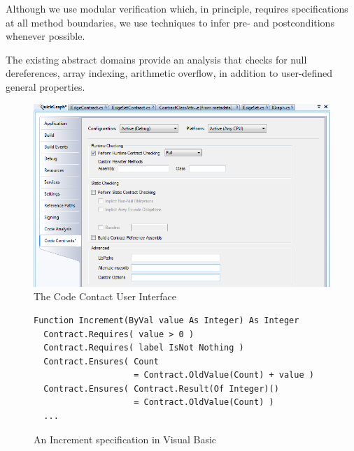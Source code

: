 \documentclass[10pt,twocolumn]{article}
\begin{document}
Although we use modular verification which, in principle, requires
specifications at all method boundaries, we use techniques to infer
pre- and postconditions whenever possible.

The existing abstract domains provide an analysis that checks for
null dereferences, array indexing, arithmetic overflow, in addition
to user-defined general properties.


\begin{figure}[tb]
\begin{center}
  \includegraphics[width=2\columnwidth]{ContractUI.png}
\end{center}
\caption{The Code Contact User Interface}
\label{fig:contractui}
\end{figure}

\begin{figure}[thb]
\begin{small}
\begin{lstlisting}
Function Increment(ByVal value As Integer) As Integer
  Contract.Requires( value > 0 )
  Contract.Requires( label IsNot Nothing )
  Contract.Ensures( Count
                    = Contract.OldValue(Count) + value )
  Contract.Ensures( Contract.Result(Of Integer)()
                    = Contract.OldValue(Count) )
  ...
\end{lstlisting}
\end{small}
\caption{An Increment specification in Visual Basic}
\label{fig:vb}
\end{figure}
\end{document}
